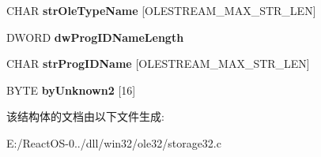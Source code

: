 \begin{DoxyCompactItemize}
C\+H\+AR {\bfseries str\+Ole\+Type\+Name} \mbox{[}O\+L\+E\+S\+T\+R\+E\+A\+M\+\_\+\+M\+A\+X\+\_\+\+S\+T\+R\+\_\+\+L\+EN\mbox{]}
\item 
\mbox{\label{struct_o_l_e_c_o_n_v_e_r_t___i_s_t_o_r_a_g_e___c_o_m_p_o_b_j_ad7152c4dab42514f13589324123e4960}} 
D\+W\+O\+RD {\bfseries dw\+Prog\+I\+D\+Name\+Length}
\item 
\mbox{\label{struct_o_l_e_c_o_n_v_e_r_t___i_s_t_o_r_a_g_e___c_o_m_p_o_b_j_ad3c3fa98875c5342367a5cc9bc98a3ec}} 
C\+H\+AR {\bfseries str\+Prog\+I\+D\+Name} \mbox{[}O\+L\+E\+S\+T\+R\+E\+A\+M\+\_\+\+M\+A\+X\+\_\+\+S\+T\+R\+\_\+\+L\+EN\mbox{]}
\item 
\mbox{\label{struct_o_l_e_c_o_n_v_e_r_t___i_s_t_o_r_a_g_e___c_o_m_p_o_b_j_a35f485b641b059f039394d8bbbac6bfc}} 
B\+Y\+TE {\bfseries by\+Unknown2} \mbox{[}16\mbox{]}
\end{DoxyCompactItemize}


该结构体的文档由以下文件生成\+:\begin{DoxyCompactItemize}
\item 
E\+:/\+React\+O\+S-\/0../dll/win32/ole32/storage32.\+c\end{DoxyCompactItemize}
